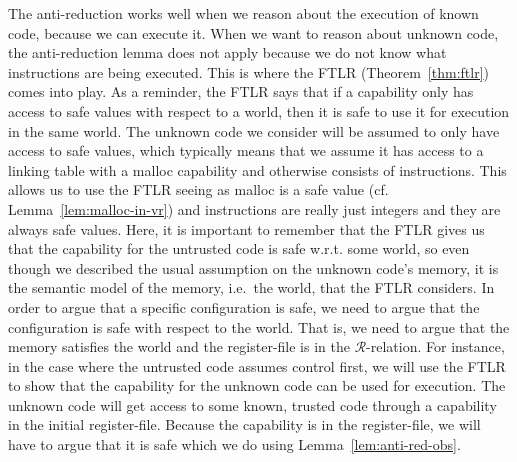 \documentclass[format=acmsmall, review=true, screen=true]{acmart}
\newcommand{\asmType}{\plaindom{AsmType}}
\newcommand{\plaindom}[1]{\mathrm{#1}}
\newcommand{\intr}[2]{\mathcal{#1}}
\newcommand{\regintr}[1]{\intr{R}{#1}}
\newcommand{\stdrr}{\regintr{\asmType}}
\newenvironment{toplas}{}{}
\begin{document}
\begin{toplas}
The anti-reduction works well when we reason about the execution of known code,
because we can execute it. When we want to reason about unknown code, the
anti-reduction lemma does not apply because we do not know what instructions are
being executed. This is where the FTLR (Theorem~\ref{thm:ftlr}) comes into play.
As a reminder, the FTLR says that if a capability only has access to safe values
with respect to a world, then it is safe to use it for execution in the same
world. The unknown code we consider will be assumed to only have access to safe
values, which typically means that we assume it has access to a linking table
with a malloc capability and otherwise consists of instructions. This allows us
to use the FTLR seeing as malloc is a safe value (cf.
Lemma~\ref{lem:malloc-in-vr}) and instructions are really just integers and they
are always safe values. Here, it is important to remember that the FTLR gives us
that the capability for the untrusted code is safe w.r.t. some world, so even
though we described the usual assumption on the unknown code's memory, it is the
semantic model of the memory, i.e.\ the world, that the FTLR considers. In order
to argue that a specific configuration is safe, we need to argue that the
configuration is safe with respect to the world. That is, we need to argue that
the memory satisfies the world and the register-file is in the
$\stdrr$-relation. For instance, in the case where the untrusted code assumes
control first, we will use the FTLR to show that the capability for the unknown
code can be used for execution. The unknown code will get access to some known,
trusted code through a capability in the initial register-file. Because the
capability is in the register-file, we will have to argue that it is safe which
we do using Lemma~\ref{lem:anti-red-obs}.


\end{toplas}
\end{document}
